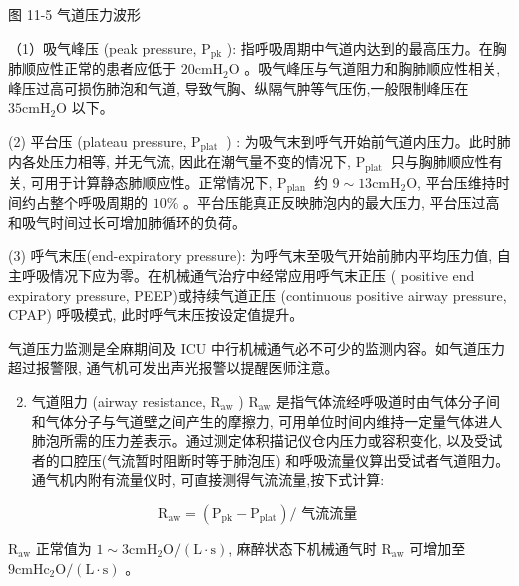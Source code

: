 \documentclass[10pt]{article}
\begin{document}
图 11-5 气道压力波形

（1）吸气峰压 (peak pressure, $\mathrm{P}_{\mathrm{pk}}$ ): 指呼吸周期中气道内达到的最高压力。在胸肺顺应性正常的患者应低于 $20 \mathrm{cmH}_{2} \mathrm{O}$ 。吸气峰压与气道阻力和胸肺顺应性相关, 峰压过高可损伤肺泡和气道, 导致气胸、纵隔气肿等气压伤,一般限制峰压在 $35 \mathrm{cmH}_{2} \mathrm{O}$ 以下。

(2) 平台压 (plateau pressure, $\mathrm{P}_{\text {plat }}$ ) : 为吸气末到呼气开始前气道内压力。此时肺内各处压力相等, 并无气流, 因此在潮气量不变的情况下, $\mathrm{P}_{\text {plat }}$ 只与胸肺顺应性有关, 可用于计算静态肺顺应性。正常情况下, $\mathrm{P}_{\text {plan }}$ 约 $9 \sim 13 \mathrm{cmH}_{2} \mathrm{O}$, 平台压维持时间约占整个呼吸周期的 $10 \%$ 。平台压能真正反映肺泡内的最大压力, 平台压过高和吸气时间过长可增加肺循环的负荷。

(3) 呼气末压(end-expiratory pressure): 为呼气末至吸气开始前肺内平均压力值, 自主呼吸情况下应为零。在机械通气治疗中经常应用呼气末正压 ( positive end expiratory pressure, PEEP)或持续气道正压 (continuous positive airway pressure, CPAP) 呼吸模式, 此时呼气末压按设定值提升。

气道压力监测是全麻期间及 ICU 中行机械通气必不可少的监测内容。如气道压力超过报警限, 通气机可发出声光报警以提醒医师注意。

\begin{enumerate}
  \setcounter{enumi}{1}
  \item 气道阻力 (airway resistance, $\mathrm{R}_{\mathrm{aw}}$ ) $\mathrm{R}_{\mathrm{aw}}$ 是指气体流经呼吸道时由气体分子间和气体分子与气道壁之间产生的摩擦力, 可用单位时间内维持一定量气体进人肺泡所需的压力差表示。通过测定体积描记仪仓内压力或容积变化, 以及受试者的口腔压(气流暂时阻断时等于肺泡压) 和呼吸流量仪算出受试者气道阻力。通气机内附有流量仪时, 可直接测得气流流量,按下式计算:
\end{enumerate}

\[
\mathrm{R}_{\mathrm{aw}}=\left(\mathrm{P}_{\mathrm{pk}}-\mathrm{P}_{\mathrm{plat}}\right) / \text { 气流流量 }
\]

$\mathrm{R}_{\mathrm{aw}}$ 正常值为 $1 \sim 3 \mathrm{cmH}_{2} \mathrm{O} /(\mathrm{L} \cdot \mathrm{s})$, 麻醉状态下机械通气时 $\mathrm{R}_{\mathrm{aw}}$ 可增加至 $9 \mathrm{cmH} \mathrm{c}_{2} \mathrm{O} /(\mathrm{L} \cdot \mathrm{s})$ 。
\end{document}
